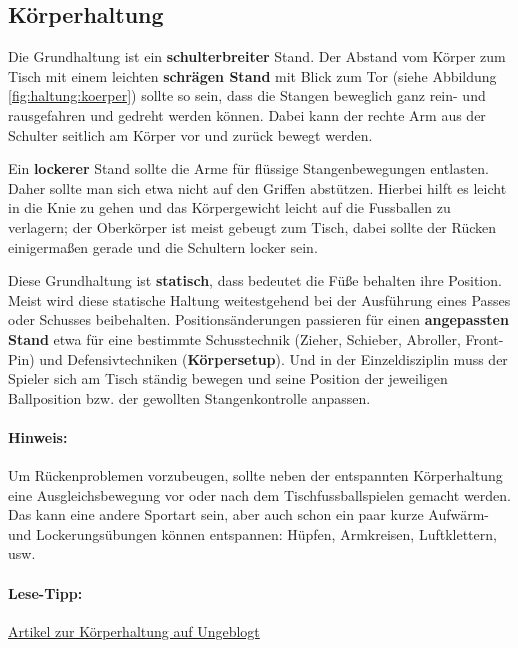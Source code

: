 \subsection{Körperhaltung}
\label{technik:haltung:koerper}

Die Grundhaltung ist ein \textbf{schulterbreiter} Stand.
Der Abstand vom Körper zum Tisch mit einem leichten \textbf{schrägen Stand} mit Blick zum Tor (siehe Abbildung \ref{fig:haltung:koerper}) sollte so sein, dass die Stangen beweglich ganz rein- und rausgefahren und gedreht werden können.
Dabei kann der rechte Arm aus der Schulter seitlich am Körper vor und zurück bewegt werden. 

Ein \textbf{lockerer} Stand sollte die Arme für flüssige Stangenbewegungen entlasten. 
Daher sollte man sich etwa nicht auf den Griffen abstützen.
Hierbei hilft es leicht in die Knie zu gehen und das Körpergewicht leicht auf die Fussballen zu verlagern; der Oberkörper ist meist gebeugt zum Tisch, dabei sollte der Rücken einigermaßen gerade und die Schultern locker sein.

Diese Grundhaltung ist \textbf{statisch}, dass bedeutet die Füße behalten ihre Position. 
Meist wird diese statische Haltung weitestgehend bei der Ausführung eines Passes oder Schusses beibehalten. 
Positionsänderungen passieren für einen \textbf{angepassten Stand} etwa für eine bestimmte Schusstechnik (Zieher, Schieber, Abroller, Front-Pin) und Defensivtechniken (\textbf{Körpersetup}).
Und in der Einzeldisziplin muss der Spieler sich am Tisch ständig bewegen und seine Position der jeweiligen Ballposition bzw. der gewollten Stangenkontrolle anpassen.

\paragraph{Hinweis:} Um Rückenproblemen vorzubeugen, sollte neben der entspannten Körperhaltung eine Ausgleichsbewegung vor oder nach dem Tischfussballspielen gemacht werden.
Das kann eine andere Sportart sein, aber auch schon ein paar kurze Aufwärm- und Lockerungsübungen können entspannen: Hüpfen, Armkreisen, Luftklettern, usw. 

\paragraph{Lese-Tipp:} \href{http://ungeblogtkickern.blogspot.de/2016/07/korperhaltung.html}{Artikel zur Körperhaltung auf Ungeblogt}

